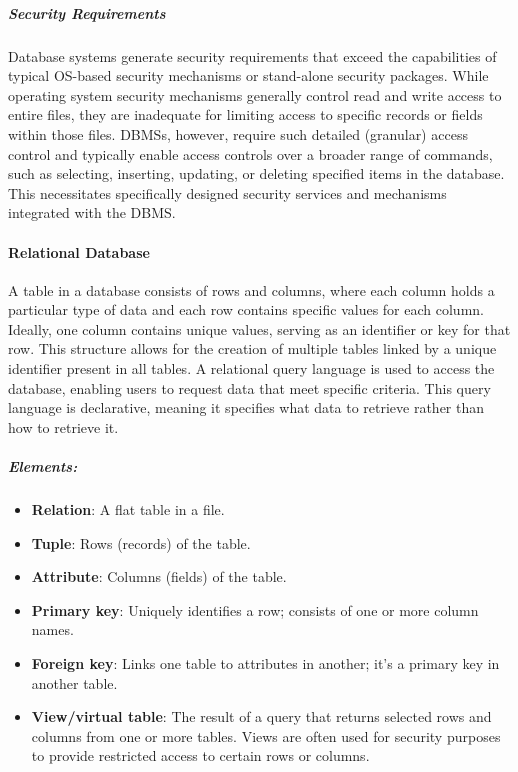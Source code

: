 \documentclass{article}
\begin{document}
                        \subparagraph{Security Requirements}
                        Database systems generate security requirements that exceed the capabilities of typical OS-based security mechanisms or stand-alone security packages. While operating system security mechanisms generally control read and write access to entire files, they are inadequate for limiting access to specific records or fields within those files. DBMSs, however, require such detailed (granular) access control and typically enable access controls over a broader range of commands, such as selecting, inserting, updating, or deleting specified items in the database. This necessitates specifically designed security services and mechanisms integrated with the DBMS.

                    \paragraph{Relational Database}
                    A table in a database consists of rows and columns, where each column holds a particular type of data and each row contains specific values for each column. Ideally, one column contains unique values, serving as an identifier or key for that row. This structure allows for the creation of multiple tables linked by a unique identifier present in all tables. A relational query language is used to access the database, enabling users to request data that meet specific criteria. This query language is declarative, meaning it specifies what data to retrieve rather than how to retrieve it.
                        \subparagraph{Elements:}
                        \begin{itemize}
                            \item \textbf{Relation}: A flat table in a file.
                            \item \textbf{Tuple}: Rows (records) of the table.
                            \item \textbf{Attribute}: Columns (fields) of the table.
                            \item \textbf{Primary key}: Uniquely identifies a row; consists of one or more column names.
                            \item \textbf{Foreign key}: Links one table to attributes in another; it’s a primary key in another table.
                            \item \textbf{View/virtual table}: The result of a query that returns selected rows and columns from one or more tables. Views are often used for security purposes to provide restricted access to certain rows or columns.
                        \end{itemize}
\end{document}
